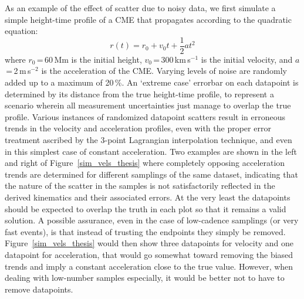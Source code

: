 \documentclass[structabstract]{aa}
\begin{document}
As an example of the effect of scatter due to noisy data, we first simulate a simple height-time profile of a CME that propagates according to the quadratic equation:
\begin{equation}
\label{eqn:const_a}
r(t) = r_0 + v_0 t + \frac{1}{2}a t^2
\end{equation}
where $r_0$\,=\,60\,Mm is the initial height, $v_0$\,=\,300\,km\,s$^{-1}$ is the initial velocity, and $a$\,=\,2\,m\,s$^{-2}$ is the acceleration of the CME. Varying levels of noise are randomly added up to a maximum of 20\,\%. An `extreme case' errorbar on each datapoint is determined by its distance from the true height-time profile, to represent a scenario wherein all measurement uncertainties just manage to overlap the true profile. Various instances of randomized datapoint scatters result in erroneous trends in the velocity and acceleration profiles, even with the proper error treatment ascribed by the 3-point Lagrangian interpolation technique, and even in this simplest case of constant acceleration. Two examples are shown in the left and right of Figure~\ref{sim_vels_thesis} where completely opposing acceleration trends are determined for different samplings of the same dataset, indicating that the nature of the scatter in the samples is not satisfactorily reflected in the derived kinematics and their associated errors. At the very least the datapoints should be expected to overlap the truth in each plot so that it remains a valid solution. A possible assurance, even in the case of low-cadence samplings (or very fast events), is that instead of trusting the endpoints they simply be removed. Figure~\ref{sim_vels_thesis} would then show three datapoints for velocity and one datapoint for acceleration, that would go somewhat toward removing the biased trends and imply a constant acceleration close to the true value. However, when dealing with low-number samples especially, it would be better not to have to remove datapoints.
\end{document}
